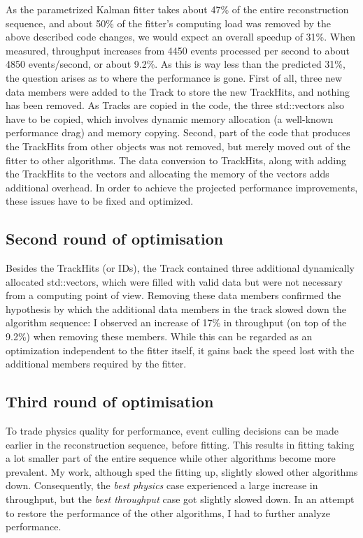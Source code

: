 \documentclass[12pt]{article}
\begin{document}
As the parametrized Kalman fitter takes about 47\% of the entire reconstruction sequence, and about 50\% of the fitter's computing load was removed by the above described code changes, we would expect an overall speedup of 31\%. When measured, throughput increases from 4450 events processed per second to about 4850 events/second, or about 9.2\%. As this is way less than the predicted 31\%, the question arises as to where the performance is gone. First of all, three new data members were added to the Track to store the new TrackHits, and nothing has been removed. As Tracks are copied in the code, the three std::vectors also have to be copied, which involves dynamic memory allocation (a well-known performance drag) and memory copying. Second, part of the code that produces the TrackHits from other objects was not removed, but merely moved out of the fitter to other algorithms. The data conversion to TrackHits, along with adding the TrackHits to the vectors and allocating the memory of the vectors adds additional overhead. In order to achieve the projected performance improvements, these issues have to be fixed and optimized.


\subsection{Second round of optimisation}

Besides the TrackHits (or IDs), the Track contained three additional dynamically allocated std::vectors, which were filled with valid data but were not necessary from a computing point of view. Removing these data members confirmed the hypothesis by which the additional data members in the track slowed down the algorithm sequence: I observed an increase of 17\% in throughput (on top of the 9.2\%) when removing these members. While this can be regarded as an optimization independent to the fitter itself, it gains back the speed lost with the additional members required by the fitter.

\subsection{Third round of optimisation}

To trade physics quality for performance, event culling decisions can be made earlier in the reconstruction sequence, before fitting. This results in fitting taking a lot smaller part of the entire sequence while other algorithms become more prevalent. My work, although sped the fitting up, slightly slowed other algorithms down. Consequently, the \textit{best physics} case experienced a large increase in throughput, but the \textit{best throughput} case got slightly slowed down. In an attempt to restore the performance of the other algorithms, I had to further analyze performance.
\end{document}
